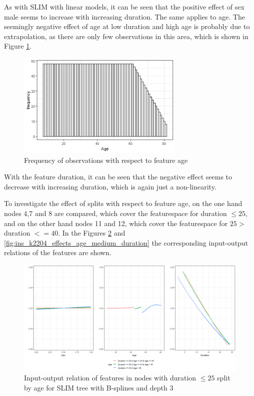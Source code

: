 As with SLIM with linear models, it can be seen that the positive effect of sex male seems to increase with increasing duration. The same applies to age. The seemingly negative effect of age at low duration and high age is probably due to extrapolation, as there are only
few observations in this area, which is shown in Figure \ref{fig:ins_k2204_hist_age}.

\begin{figure}[!htb]
    \centering
    \includegraphics[width = 8cm]{Figures/insurance_use_case/k2204_BPV/hist_age.png}
    \caption{Frequency of observations with respect to feature age}
    \label{fig:ins_k2204_hist_age}
\end{figure}

With the feature duration, it can be seen that the negative effect seems to decrease with increasing duration, which is again just a non-linearity.

To investigate the effect of splits with respect to feature age, on the one hand nodes 4,7 and 8 are compared, which cover the featurespace for duration $\leq 25$, and on the other hand nodes 11 and 12, which cover the featurespace for $25 > $duration $<= 40$. In the Figures \ref{fig:ins_k2204_effects_age_low_duration} and \ref{fig:ins_k2204_effects_age_medium_duration} the corresponding input-output relations of the features are shown.

\begin{figure}[!htb]
    \centering    
    \includegraphics[width = 16cm]{Figures/insurance_use_case/k2204_BPV/effects_age_low_duration.png}
    \caption{Input-output relation of features in nodes with duration $\leq 25$ split by age for SLIM tree with B-splines and depth 3}
    \label{fig:ins_k2204_effects_age_low_duration}
\end{figure}

